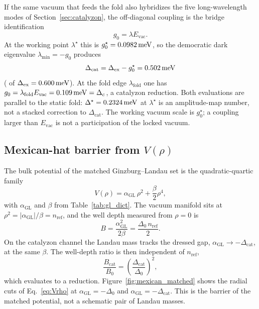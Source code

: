 If the same vacuum that feeds the fold also hybridizes the five long-wavelength modes of Section~\ref{sec:catalyzon}, the off-diagonal coupling is the bridge identification
\begin{equation}
g_0=\lambda E_{\mathrm{vac}}.
\label{eq:g0_bridge}
\end{equation}
At the working point $\lambda^\star$ this is $g_0^\star=0.0982\,\mathrm{meV}$, so the democratic dark eigenvalue $\lambda_{\min}=-g_0$ produces
\begin{equation}
\Delta_{\mathrm{cat}}=\Delta_{\mathrm{ex}}-g_0^\star=0.502\,\mathrm{meV}
\end{equation}
(\pctcat{} of $\Delta_{\mathrm{ex}}=0.600\,\mathrm{meV}$). At the fold edge $\lambda_{\mathrm{fold}}$ one has $g_0=\lambda_{\mathrm{fold}}E_{\mathrm{vac}}=0.109\,\mathrm{meV}=\Delta_c$, a \pctcatfold{} catalyzon reduction. Both evaluations are parallel to the static fold: $\Delta^\star=0.2324\,\mathrm{meV}$ at $\lambda^\star$ is an amplitude-map number, not a stacked correction to $\Delta_{\mathrm{cat}}$. The working vacuum scale is $g_0^\star$; a coupling larger than $E_{\mathrm{vac}}$ is not a participation of the locked vacuum.

\subsection{Mexican-hat barrier from $V(\rho)$}
\label{sec:mexican_dict}

The bulk potential of the matched Ginzburg--Landau set is the quadratic-quartic family
\begin{equation}
V(\rho)=\alpha_{\mathrm{GL}}\,\rho^2+\frac{\beta}{2}\rho^4,
\label{eq:Vrho}
\end{equation}
with $\alpha_{\mathrm{GL}}$ and $\beta$ from Table~\ref{tab:gl_dict}. The vacuum manifold sits at $\rho^2=|\alpha_{\mathrm{GL}}|/\beta=n_{\mathrm{ref}}$, and the well depth measured from $\rho=0$ is
\begin{equation}
B=\frac{\alpha_{\mathrm{GL}}^2}{2\beta}=\frac{\Delta_0\,n_{\mathrm{ref}}}{2}.
\end{equation}
On the catalyzon channel the Landau mass tracks the dressed gap, $\alpha_{\mathrm{GL}}\to-\Delta_{\mathrm{cat}}$, at the same $\beta$. The well-depth ratio is then independent of $n_{\mathrm{ref}}$,
\begin{equation}
\frac{B_{\mathrm{cat}}}{B_0}=\left(\frac{\Delta_{\mathrm{cat}}}{\Delta_0}\right)^2,
\end{equation}
which evaluates to a \hatbarrier{} reduction. Figure~\ref{fig:mexican_matched} shows the radial cuts of Eq.~\eqref{eq:Vrho} at $\alpha_{\mathrm{GL}}=-\Delta_0$ and $\alpha_{\mathrm{GL}}=-\Delta_{\mathrm{cat}}$. This is the barrier of the matched potential, not a schematic pair of Landau masses.


